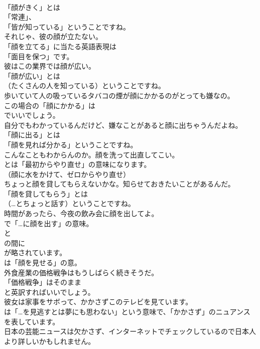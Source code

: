 \documentclass[8pt]{extreport}
\begin{document}
\begin{CJK}{UTF8}{min}
\\	「顔がきく」とは
\\	「常連」、
\\	「皆が知っている」ということですね。	
\\	それじゃ、彼の顔が立たない。 
\\	「顔を立てる」に当たる英語表現は
\\	「面目を保つ」です。	
\\	彼はこの業界では顔が広い。 
\\	「顔が広い」とは 
\\	（たくさんの人を知っている）ということですね。	
\\	歩いていて人の吸っているタバコの煙が顔にかかるのがとっても嫌なの。 
\\	この場合の「顔にかかる」は
\\	でいいでしょう。	
\\	自分でもわかっているんだけど、嫌なことがあると顔に出ちゃうんだよね。 
\\	「顔に出る」とは
\\	「顔を見れば分かる」ということですね。	
\\	こんなこともわからんのか。顔を洗って出直してこい。 
\\	とは「最初からやり直せ」の意味になります。
\\	（顔に水をかけて、ゼロからやり直せ）	
\\	ちょっと顔を貸してもらえないかな。知らせておきたいことがあるんだ。 
\\	「顔を貸してもらう」とは
\\	（…とちょっと話す）ということですね。	
\\	時間があったら、今夜の飲み会に顔を出してよ。 
\\	で「…に顔を出す」の意味。
\\	と
\\	の間に
\\	が略されています。
\\	は「顔を見せる」の意。	
\\	外食産業の価格戦争はもうしばらく続きそうだ。 
\\	「価格戦争」はそのまま 
\\	と英訳すればいいでしょう。	
\\	彼女は家事をサボって、かかさずこのテレビを見ています。 
\\	は「…を見逃すとは夢にも思わない」という意味で、「かかさず」のニュアンスを表しています。	
\\	日本の芸能ニュースは欠かさず、インターネットでチェックしているので日本人より詳しいかもしれません。 

\end{CJK}
\end{document}
